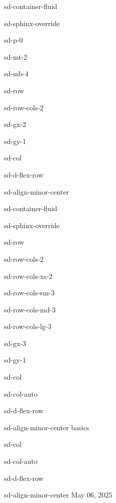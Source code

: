 \documentclass[letterpaper,10pt,english]{jupyterBook}
\begin{document}
\begin{sphinxuseclass}{sd-container-fluid}
\begin{sphinxuseclass}{sd-sphinx-override}
\begin{sphinxuseclass}{sd-p-0}
\begin{sphinxuseclass}{sd-mt-2}
\begin{sphinxuseclass}{sd-mb-4}
\begin{sphinxuseclass}{sd-row}
\begin{sphinxuseclass}{sd-row-cols-2}
\begin{sphinxuseclass}{sd-gx-2}
\begin{sphinxuseclass}{sd-gy-1}
\begin{sphinxuseclass}{sd-col}
\begin{sphinxuseclass}{sd-d-flex-row}
\begin{sphinxuseclass}{sd-align-minor-center}
\begin{sphinxuseclass}{sd-container-fluid}
\begin{sphinxuseclass}{sd-sphinx-override}
\begin{sphinxuseclass}{sd-row}
\begin{sphinxuseclass}{sd-row-cols-2}
\begin{sphinxuseclass}{sd-row-cols-xs-2}
\begin{sphinxuseclass}{sd-row-cols-sm-3}
\begin{sphinxuseclass}{sd-row-cols-md-3}
\begin{sphinxuseclass}{sd-row-cols-lg-3}
\begin{sphinxuseclass}{sd-gx-3}
\begin{sphinxuseclass}{sd-gy-1}
\begin{sphinxuseclass}{sd-col}
\begin{sphinxuseclass}{sd-col-auto}
\begin{sphinxuseclass}{sd-d-flex-row}
\begin{sphinxuseclass}{sd-align-minor-center}
\sphinxAtStartPar
basics

\end{sphinxuseclass}
\end{sphinxuseclass}
\end{sphinxuseclass}
\end{sphinxuseclass}
\begin{sphinxuseclass}{sd-col}
\begin{sphinxuseclass}{sd-col-auto}
\begin{sphinxuseclass}{sd-d-flex-row}
\begin{sphinxuseclass}{sd-align-minor-center}
\sphinxAtStartPar
May 06, 2025


\end{sphinxuseclass}
\end{sphinxuseclass}
\end{sphinxuseclass}
\end{sphinxuseclass}
\end{sphinxuseclass}
\end{sphinxuseclass}
\end{sphinxuseclass}
\end{sphinxuseclass}
\end{sphinxuseclass}
\end{sphinxuseclass}
\end{sphinxuseclass}
\end{sphinxuseclass}
\end{sphinxuseclass}
\end{sphinxuseclass}
\end{sphinxuseclass}
\end{sphinxuseclass}
\end{sphinxuseclass}
\end{sphinxuseclass}
\end{sphinxuseclass}
\end{sphinxuseclass}
\end{sphinxuseclass}
\end{sphinxuseclass}
\end{sphinxuseclass}
\end{sphinxuseclass}
\end{sphinxuseclass}
\end{sphinxuseclass}
\end{document}
